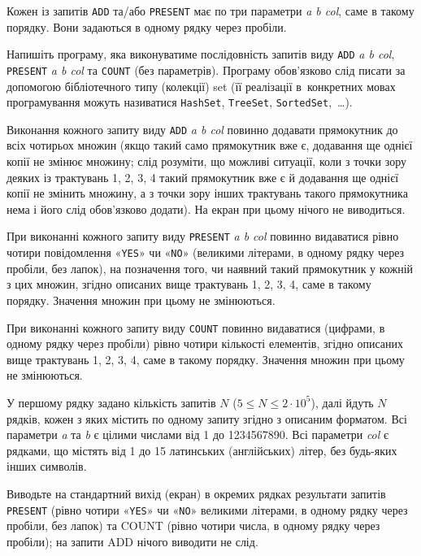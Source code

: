 Кожен із запитів {\tt ADD} та/або {\tt PRESENT} має по три параметри {\it a b col}, саме в такому порядку. Вони задаються в одному рядку через пробіли.

Напишіть програму, яка виконуватиме послідовність запитів виду {\tt ADD} {\it a b col}, {\tt PRESENT} {\it a b col} та {\tt COUNT} (без параметрів). Програму обов'язково слід писати за допомогою бібліотечного типу (колекції) set (її реалізації в~конкретних мовах програмування можуть називатися {\tt HashSet}, {\tt TreeSet}, {\tt SortedSet},~\dots).

Виконання кожного запиту виду {\tt ADD} {\it a b col} повинно додавати прямокутник до всіх чотирьох множин (якщо такий само прямокутник вже є, додавання ще однієї копії не змінює множину; слід розуміти, що можливі ситуації, коли з точки зору деяких із трактувань 1, 2, 3, 4 такий прямокутник вже є й додавання ще однієї копії не змінить множину, а з точки зору інших трактувань такого прямокутника нема і його слід обов'язково додати). На екран при цьому нічого не виводиться. 

При виконанні кожного запиту виду {\tt PRESENT} {\it a b col} повинно видаватися рівно чотири повідомлення «{\tt YES}» чи «{\tt NO}» (великими літерами, в одному рядку через пробіли, без лапок), на позначення того, чи наявний такий прямокутник у кожній з цих множин, згідно описаних вище трактувань 1, 2, 3, 4, саме в такому порядку. Значення множин при цьому не змінюються. 

При виконанні кожного запиту виду {\tt COUNT} повинно видаватися (цифрами, в одному рядку через пробіли) рівно чотири кількості елементів, згідно описаних вище трактувань 1, 2, 3, 4, саме в такому порядку. Значення множин при цьому не змінюються.


\InputFile

У першому рядку задано кількість запитів $N$ ($5\leqslant N\leqslant 2\cdot10^5$), далі йдуть $N$ рядків, кожен з яких містить по одному запиту згідно з описаним форматом. Всі параметри {\it a} та {\it b} є цілими числами від 1 до 1234567890. Всі параметри {\it col} є рядками, що містять від 1 до 15 латинських (англійських) літер, без будь-яких інших символів. 



\OutputFile

Виводьте на стандартний вихід (екран) в окремих рядках результати запитів {\tt PRESENT} (рівно чотири «{\tt YES}» чи «{\tt NO}» великими літерами, в одному рядку через пробіли, без лапок) та COUNT (рівно чотири числа, в одному рядку через пробіли); на запити ADD нічого виводити не слід. 


